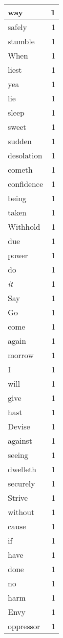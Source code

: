 \begin{center}
\begin{longtable}{l|r}
way & 1\\ \hline 
safely & 1\\ \hline 
stumble & 1\\ \hline 
When & 1\\ \hline 
liest & 1\\ \hline 
yea & 1\\ \hline 
lie & 1\\ \hline 
sleep & 1\\ \hline 
sweet & 1\\ \hline 
sudden & 1\\ \hline 
desolation & 1\\ \hline 
cometh & 1\\ \hline 
confidence & 1\\ \hline 
being & 1\\ \hline 
taken & 1\\ \hline 
Withhold & 1\\ \hline 
due & 1\\ \hline 
power & 1\\ \hline 
do & 1\\ \hline 
\emph{it} & 1\\ \hline 
Say & 1\\ \hline 
Go & 1\\ \hline 
come & 1\\ \hline 
again & 1\\ \hline 
morrow & 1\\ \hline 
I & 1\\ \hline 
will & 1\\ \hline 
give & 1\\ \hline 
hast & 1\\ \hline 
Devise & 1\\ \hline 
against & 1\\ \hline 
seeing & 1\\ \hline 
dwelleth & 1\\ \hline 
securely & 1\\ \hline 
Strive & 1\\ \hline 
without & 1\\ \hline 
cause & 1\\ \hline 
if & 1\\ \hline 
have & 1\\ \hline 
done & 1\\ \hline 
no & 1\\ \hline 
harm & 1\\ \hline 
Envy & 1\\ \hline 
oppressor & 1\\ \hline 

\end{longtable}
\end{center}

